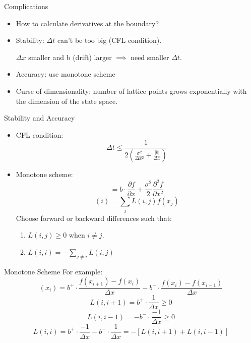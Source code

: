 \documentclass{beamer}
\begin{document}
	\begin{frame}{Complications}
		\begin{itemize}
			\item {
				How to calculate derivatives at the boundary?
			}
			\item {
				Stability: $\Delta t$ can't be too big (CFL condition).
				\begin{center}
					$\Delta x$ smaller and b (drift) larger $\implies$ need smaller $\Delta t$.
				\end{center}
			}
			\item {
				Accuracy: use monotone scheme
			}
			\item {
				Curse of dimensionality: number of lattice points grows exponentially with the dimension of the state space.
			}
		\end{itemize}
	\end{frame}
	
	\begin{frame}{Stability and Accuracy}
		\begin{itemize}
			\item CFL condition:
			\begin{equation} 
				\Delta t \leq \frac{1}{2(\frac{\sigma^2}{\Delta x^2}+\frac{|b|}{\Delta x})}
			\end{equation}
			\item Monotone scheme:
			\begin{equation}
				[Lf]=b \cdot \frac{\partial f}{\partial x} + \frac{\sigma^2}{2}\frac{\partial^2 f}{\partial x^2}
			\end{equation}
			\begin{equation}
				[Lf](i)=\sum_{j} L(i,j) f(x_j)
			\end{equation}
			Choose forward or backward differences such that:
			\begin{enumerate}
				\item $L(i,j)\geq 0$ when $i \neq j$.
				\item $L(i,i)=-\sum_{j\neq i} L(i,j)$
			\end{enumerate}
			
		\end{itemize}
	\end{frame}
	
	\begin{frame}{Monotone Scheme}
		For example:
		\begin{equation}
			[b \cdot \frac{\partial f}{\partial x} ](x_i)=b^{+} \cdot \frac{f(x_{i+1})-f(x_i)}{\Delta x}-b^{-} \cdot \frac{f(x_{i})-f(x_{i-1})}{\Delta x}
		\end{equation}
		\begin{equation}
			L(i,i+1)=b^{+} \cdot \frac{1}{\Delta x} \geq 0
		\end{equation}
		\begin{equation}
			L(i,i-1)=-b^{-} \cdot \frac{-1}{\Delta x} \geq 0
		\end{equation}
		\begin{equation}
			L(i,i)=b^{+} \cdot \frac{-1}{\Delta x}-b^{-} \cdot \frac{1}{\Delta x} = -[L(i,i+1)+L(i,i-1)]
		\end{equation}
	\end{frame}
	
\end{document}
